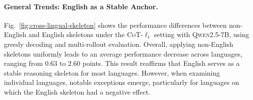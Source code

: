 
\paragraph{General Trends: English as a Stable Anchor.}
Fig.~\ref{fig:cross-lingual-skeleton} shows the performance differences between non-English and English skeletons under the \textsc{CoT-$\ell_t$} setting with \textsc{Qwen2.5-7B}, using greedy decoding and multi-rollout evaluation. Overall, applying non-English skeletons uniformly leads to an average performance decrease across languages, ranging from 0.63 to 2.60 points. This result reaffirms that English serves as a stable reasoning skeleton for most languages. However, when examining individual languages, notable exceptions emerge, particularly for languages on which the English skeleton had a negative effect.

